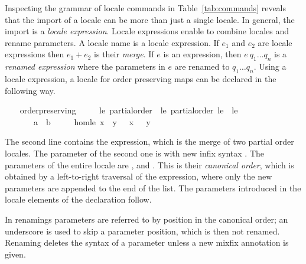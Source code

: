 \begin{isabellebody}
\begin{isamarkuptext}
  Inspecting the grammar of locale commands in
  Table~\ref{tab:commands} reveals that the import of a locale can be
  more than just a single locale.  In general, the import is a
  \emph{locale expression}.  Locale expressions enable to combine locales
  and rename parameters.  A locale name is a locale expression.  If
  $e_1$ and $e_2$ are locale expressions then $e_1 + e_2$ is their
  \emph{merge}.  If $e$ is an expression, then $e~q_1 \ldots q_n$ is
  a \emph{renamed expression} where the parameters in $e$ are renamed
  to $q_1 \ldots q_n$.  Using a locale expression, a locale for order
  preserving maps can be declared in the following way.%
\end{isamarkuptext}%
\isamarkuptrue%
\ \ \isamarkupfalse%
\ order{\isacharunderscore}preserving\ {\isacharequal}\isanewline
\ \ \ \ le{\isacharcolon}\ partial{\isacharunderscore}order\ {\isacharplus}\ le{\isacharprime}{\isacharcolon}\ partial{\isacharunderscore}order\ le{\isacharprime}\ \ le{\isacharprime}\ {\isacharparenleft}\ {\isachardoublequoteopen}{\isasympreceq}{\isachardoublequoteclose}\ {}{}{\isacharparenright}\ {\isacharplus}\isanewline
\ \ \ \ \ {\isasymphi}\ {\isacharcolon}{\isacharcolon}\ {\isachardoublequoteopen}{\isacharprime}a\ {\isasymRightarrow}\ {\isacharprime}b{\isachardoublequoteclose}\isanewline
\ \ \ \ \ hom{\isacharunderscore}le{\isacharcolon}\ {\isachardoublequoteopen}x\ {\isasymsqsubseteq}\ y\ {\isasymLongrightarrow}\ {\isasymphi}\ x\ {\isasympreceq}\ {\isasymphi}\ y{\isachardoublequoteclose}%
\begin{isamarkuptext}%
The second line contains the expression, which is the
  merge of two partial order locales.  The parameter of the second one
  is  with new infix syntax \isa{{\isasympreceq}}.  The
  parameters of the entire locale are ,  and
  \isa{{\isasymphi}}.  This is their \emph{canonical order},
  which is obtained by a left-to-right traversal of the expression,
  where only the new parameters are appended to the end of the list.  The
  parameters introduced in the locale elements of the declaration
  follow.

  In renamings parameters are referred to by position in the canonical
  order; an underscore is used to skip a parameter position, which is
  then not renamed.  Renaming deletes the syntax of a parameter unless
  a new mixfix annotation is given.


\end{isamarkuptext}
\end{isabellebody}
